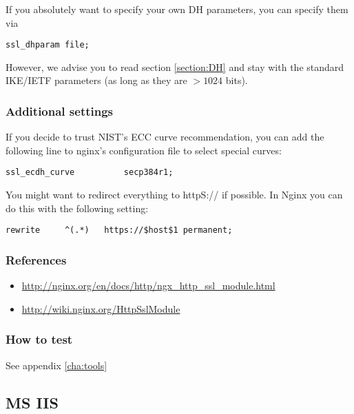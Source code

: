 If you absolutely want to specify your own DH parameters, you can specify them via

\begin{lstlisting}[breaklines]
  ssl_dhparam file;
\end{lstlisting}

However, we advise you to read section \ref{section:DH} and stay with the standard IKE/IETF parameters (as long as they are $ > 1024 $ bits).

\subsubsection{Additional settings}

If you decide to trust NIST's ECC curve recommendation, you can add the following line to nginx's configuration file to select special curves:

\begin{lstlisting}[breaklines]
  ssl_ecdh_curve          secp384r1;
\end{lstlisting}

You might want to redirect everything to httpS:// if possible. In Nginx you can do this with the following setting:

\begin{lstlisting}[breaklines]
  rewrite     ^(.*)   https://$host$1 permanent;
\end{lstlisting}


\subsubsection{References} 
\begin{itemize}
\item \url{http://nginx.org/en/docs/http/ngx_http_ssl_module.html}
\item \url{http://wiki.nginx.org/HttpSslModule}
\end{itemize}

\subsubsection{How to test}
See appendix \ref{cha:tools}





\subsection{MS IIS}
\label{sec:ms-iis}


